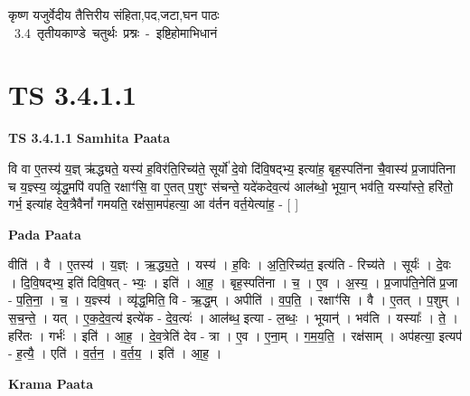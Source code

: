 \documentclass[17pt]{extarticle}
\begin{document}
\begin{titlepage}
    \begin{center}
 
\begin{sanskrit}
    { \Large
    कृष्ण यजुर्वेदीय तैत्तिरीय संहिता,पद,जटा,घन पाठः 
    }
    \\
    \vspace{2.5cm}
    \mbox{ \Large
    3.4      तृतीयकाण्डे चतुर्थः प्रश्नः - इष्टिहोमाभिधानं   }
\end{sanskrit}
\end{center}

\end{titlepage}
\tableofcontents
{}
\pagebreak


\section{ TS 3.4.1.1 }

\textbf{TS 3.4.1.1 } \newline
\textbf{Samhita Paata} \newline

वि वा ए॒तस्य॑ य॒ज्ञ् ऋ॑द्ध्यते॒ यस्य॑ ह॒विर॑ति॒रिच्य॑ते॒ सूर्यो॑ दे॒वो दि॑वि॒षद्भ्य॒ इत्या॑ह॒ बृह॒स्पति॑ना चै॒वास्य॑ प्र॒जाप॑तिना च य॒ज्ञ्स्य॒ व्यृ॑द्ध॒मपि॑ वपति॒ रक्षाꣳ॑सि॒ वा ए॒तत् प॒शुꣳ स॑चन्ते॒ यदे॑कदेव॒त्य॑ आल॑ब्धो॒ भूया॒न् भव॑ति॒ यस्या᳚स्ते॒ हरि॑तो॒ गर्भ॒ इत्या॑ह देव॒त्रैवैनां᳚ गमयति॒ रक्ष॑सा॒मप॑हत्या॒ आ व॑र्तन वर्त॒येत्या॑ह॒ - [  ] \newline

\textbf{Pada Paata} \newline

वीति॑ । वै । ए॒तस्य॑ । य॒ज्ञ्ः । ऋ॒द्ध्य॒ते॒ । यस्य॑ । ह॒विः । अ॒ति॒रिच्य॑त॒ इत्य॑ति - रिच्य॑ते । सूर्यः॑ । दे॒वः । दि॒वि॒षद्भ्य॒ इति॑ दिवि॒षत् - भ्यः॒ । इति॑ । आ॒ह॒ । बृह॒स्पति॑ना । च॒ । ए॒व । अ॒स्य॒ । प्र॒जाप॑ति॒नेति॑ प्र॒जा - प॒ति॒ना॒ । च॒ । य॒ज्ञ्स्य॑ । व्यृ॑द्ध॒मिति॒ वि - ऋ॒द्ध॒म् । अपीति॑ । व॒प॒ति॒ । रक्षाꣳ॑सि । वै । ए॒तत् । प॒शुम् । स॒च॒न्ते॒ । यत् । ए॒क॒दे॒व॒त्य॑ इत्ये॑क - दे॒व॒त्यः॑ । आल॑ब्ध॒ इत्या - ल॒ब्धः॒ । भूयान्॑ । भव॑ति । यस्याः᳚ । ते॒ । हरि॑तः । गर्भः॑ । इति॑ । आ॒ह॒ । दे॒व॒त्रेति॑ देव - त्रा । ए॒व । ए॒ना॒म् । ग॒म॒य॒ति॒ । रक्ष॑साम् । अप॑हत्या॒ इत्यप॑ - ह॒त्यै॒ । एति॑ । व॒र्त॒न॒ । व॒र्त॒य॒ । इति॑ । आ॒ह॒ ।  \newline


\textbf{Krama Paata} \newline
\end{document}
